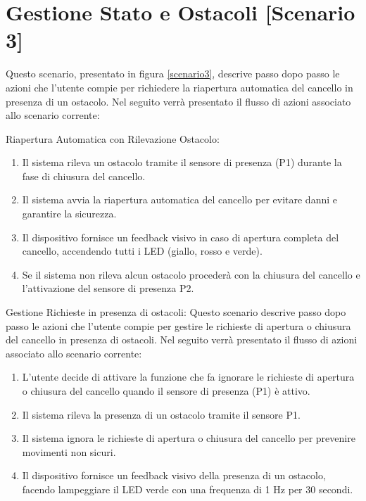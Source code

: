 \section{Gestione Stato e Ostacoli [Scenario 3]}
Questo scenario, presentato in figura \ref{scenario3}, descrive passo dopo passo le azioni che l’utente compie per richiedere la riapertura automatica del cancello in presenza di un ostacolo. Nel seguito verrà presentato il flusso di azioni associato allo scenario corrente:

\noindent Riapertura Automatica con Rilevazione Ostacolo:

\begin{enumerate}
\item Il sistema rileva un ostacolo tramite il sensore di presenza (P1) durante la fase di chiusura del cancello.
\item Il sistema avvia la riapertura automatica del cancello per evitare danni e garantire la sicurezza.
\item Il dispositivo fornisce un feedback visivo in caso di apertura completa del cancello, accendendo tutti i LED (giallo, rosso e verde).
\item Se il sistema non rileva alcun ostacolo procederà con la chiusura del cancello e l'attivazione del sensore di presenza P2.
\end{enumerate}

\noindent Gestione Richieste in presenza di ostacoli:
Questo scenario descrive passo dopo passo le azioni che l’utente compie per gestire le richieste di apertura o chiusura del cancello in presenza di ostacoli. Nel seguito verrà presentato il flusso di azioni associato allo scenario corrente:


\begin{enumerate}
\item L’utente decide di attivare la funzione che fa ignorare le richieste di apertura o chiusura del cancello quando il sensore di presenza (P1) è attivo.
\item Il sistema rileva la presenza di un ostacolo tramite il sensore P1.
\item Il sistema ignora le richieste di apertura o chiusura del cancello per prevenire movimenti non sicuri.
\item Il dispositivo fornisce un feedback visivo della presenza di un ostacolo, facendo lampeggiare il LED verde con una frequenza di 1 Hz per 30 secondi.
\end{enumerate}


